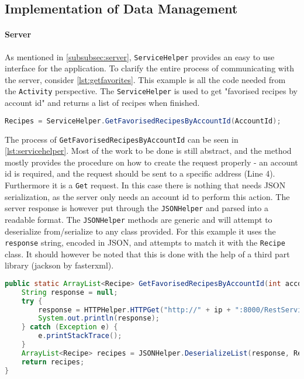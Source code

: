 \subsection{Implementation of Data Management}
\label{subsec:datamanagement}


\paragraph{Server}
As mentioned in \ref{subsubsec:server}, \texttt{ServiceHelper} provides an easy to use interface for the application. To clarify the entire process of communicating with the server, consider \ref{lst:getfavorites}. This example is all the code needed from the \texttt{Activity} perspective. The \texttt{ServiceHelper} is used to get "favorised recipes by account id" and returns a list of recipes when finished.

\begin{lstlisting}[language=java, label={lst:getfavorites}, caption={Sending a server request from an Activity}]
Recipes = ServiceHelper.GetFavorisedRecipesByAccountId(AccountId);
\end{lstlisting}

The process of \texttt{GetFavorisedRecipesByAccountId} can be seen in \ref{lst:servicehelper}. Most of the work to be done is still abstract, and the method mostly provides the procedure on how to create the request properly - an account id is required, and the request should be sent to a specific address (Line 4). Furthermore it is a \texttt{Get} request.
In this case there is nothing that needs JSON serialization, as the server only needs an account id to perform this action. The server response is however put through the \texttt{JSONHelper} and parsed into a readable format. The \texttt{JSONHelper} methods are generic and will attempt to deserialize from/serialize to any class provided. For this example it uses the \texttt{response} string, encoded in JSON, and attempts to match it with the \texttt{Recipe} class. It should however be noted that this is done with the help of a third part library (jackson by fasterxml)\cite{jackson}.

\begin{lstlisting}[language=java, label={lst:servicehelper}, caption={GetFavorisedRecipesByAccountId from ServiceHelper}]
public static ArrayList<Recipe> GetFavorisedRecipesByAccountId(int accountId){
    String response = null;
    try {
        response = HTTPHelper.HTTPGet("http://" + ip + ":8000/RestService/Favorises/GetFavorisedRecipesByAccountId?accountId=" + accountId);
        System.out.println(response);
    } catch (Exception e) {
        e.printStackTrace();
    }
    ArrayList<Recipe> recipes = JSONHelper.DeserializeList(response, Recipe.class);
    return recipes;
}
\end{lstlisting}

